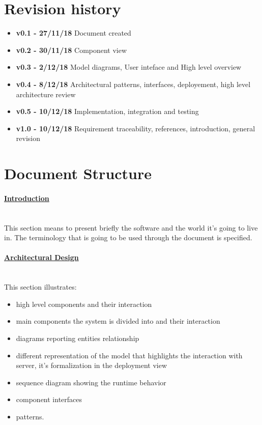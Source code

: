 \section{Revision history}
\begin{itemize}
\item \textbf{v0.1 - 27/11/18} Document created
\item \textbf{v0.2 - 30/11/18} Component view
\item \textbf{v0.3 - 2/12/18} Model diagrams, User inteface and High level overview
\item \textbf{v0.4 - 8/12/18} Architectural patterns, interfaces, deployement, high level architecture review
\item \textbf{v0.5 - 10/12/18} Implementation, integration and testing 
\item \textbf{v1.0 - 10/12/18} Requirement traceability, references, introduction, general revision
\end{itemize}
\section{Document Structure}
\paragraph{\hyperref[sect:introduction]{Introduction}} \mbox{}\\
This section means to present briefly the software and the world it’s going to live in. The terminology that is going to be used through the document is specified.
\paragraph{\hyperref[sect:architecturalDesign]{Architectural Design}} \mbox{}\\
This section illustrates:
\begin{itemize}
\item high level components and their interaction
\item main components the system is divided into and their interaction
\item diagrams reporting entities relationship
\item different representation of the model that highlights the interaction with server, it’s formalization in the deployment view
\item sequence diagram showing the runtime behavior 
\item component interfaces 
\item patterns.
\end{itemize}
